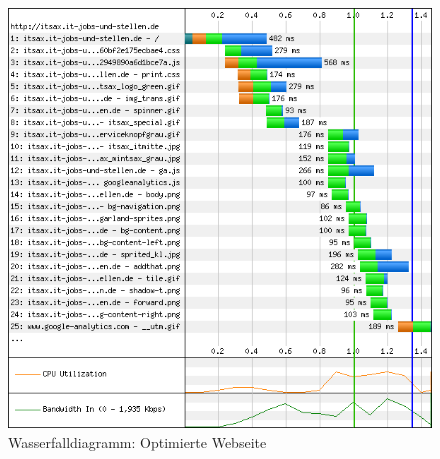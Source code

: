 \begin{figure}[!ht]
  \centering
  \includegraphics[scale=0.5]{material/end_waterfall.png}
  \caption{Wasserfalldiagramm: Optimierte Webseite}
  \label{fig:endwaterfall}
\end{figure}
